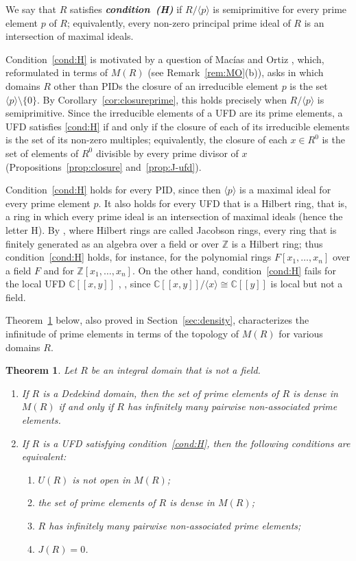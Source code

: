 \documentclass[12pt,reqno,a4paper]{amsart}
\makeatletter
\newcommand{\Z}{\mathbb{Z}}
\newcommand{\C}{\mathbb{C}}
\newcommand{\pow}[1]{[\![#1]\!]}
\newcommand*{\namedlabel}[2]{\begingroup\phantomsection\def\@currentlabel{#2}\label{#1}\endgroup}
\theoremstyle{plain}
\newtheorem{theorem}{Theorem}[section]
\theoremstyle{definition}
\makeatother
\begin{document}
We say that $R$ satisfies \textbf{\textit{condition~(H)}}\namedlabel{cond:H}{\textup{(H)}} if $R/\langle p\rangle$ is semiprimitive for every prime element $p$ of $R$; equivalently, every non-zero principal prime ideal of $R$ is an intersection of maximal ideals.

Condition~\ref{cond:H} is motivated by a question of Mac\'ias and Ortiz \cite[Problem~3.18]{MaciasOrtiz}, which, reformulated in terms of $M(R)$ (see Remark~\ref{rem:MO}(b)), asks in which domains $R$ other than PIDs the closure of an irreducible element $p$ is the set $\langle p\rangle\setminus\{0\}$. By Corollary~\ref{cor:closureprime}, this holds precisely when $R/\langle p\rangle$ is semiprimitive. Since the irreducible elements of a UFD are its prime elements, a UFD satisfies \ref{cond:H} if and only if the closure of each of its irreducible elements is the set of its non-zero multiples; equivalently, the closure of each $x\in R^0$ is the set of elements of $R^0$ divisible by every prime divisor of $x$ (Propositions~\ref{prop:closure} and~\ref{prop:J-ufd}).

Condition~\ref{cond:H} holds for every PID, since then $\langle p\rangle$ is a maximal ideal for every prime element $p$. It also holds for every UFD that is a Hilbert ring, that is, a ring in which every prime ideal is an intersection of maximal ideals (hence the letter H). By \cite[Theorem~4.19]{Eisenbud}, where Hilbert rings are called Jacobson rings, every ring that is finitely generated as an algebra over a field or over $\Z$ is a Hilbert ring; thus condition~\ref{cond:H} holds, for instance, for the polynomial rings $F[x_1,\dots,x_n]$ over a field $F$ and for $\Z[x_1,\dots,x_n]$. On the other hand, condition~\ref{cond:H} fails for the local UFD $\C\pow{x,y}$ \cite[Chapter~1, Exercise~5]{AtiyahMacdonald}, \cite[Theorem~20.3]{Matsumura}, since $\C\pow{x,y}/\langle x\rangle\cong\C\pow{y}$ is local but not a field. 

Theorem~\ref{thm:primes} below, also proved in Section~\ref{sec:density}, characterizes the infinitude of prime elements in terms of the topology of $M(R)$ for various domains $R$.
\begin{theorem}\label{thm:primes}
Let $R$ be an integral domain that is not a field.
\begin{enumerate}[label=\textup{(\roman*)}]
\item If $R$ is a Dedekind domain, then the set of prime elements of $R$ is dense in $M(R)$ if and only if $R$ has infinitely many pairwise non-associated prime elements.
\item If $R$ is a UFD satisfying condition~\ref{cond:H}, then the following conditions are equivalent:
\begin{enumerate}[label=\textup{(\alph*)}]
\item $U(R)$ is not open in $M(R)$;
\item the set of prime elements of $R$ is dense in $M(R)$;
\item $R$ has infinitely many pairwise non-associated prime elements;
\item $J(R)=0$.
\end{enumerate}
\end{enumerate}
\end{theorem}
\end{document}
